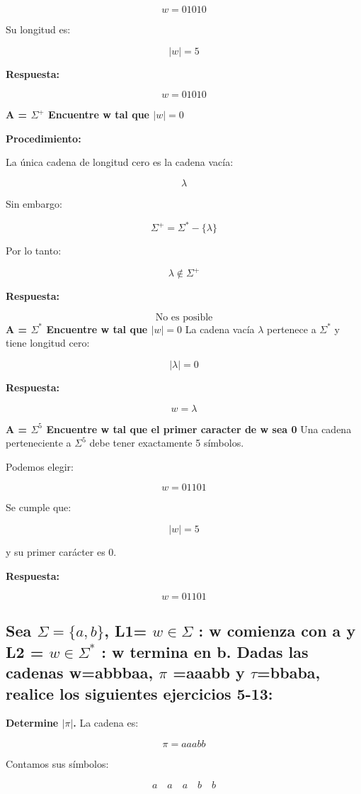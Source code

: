 \documentclass[12pt]{article}
\begin{document}
\[
w = 01010
\]

Su longitud es:

\[
|w| = 5
\]

\textbf{Respuesta:}

\[
\boxed{w=01010}
\]

\textbf{A = $\Sigma^+$ Encuentre w tal que $|w| =0$}

\textbf{Procedimiento:}

La única cadena de longitud cero es la cadena vacía:

\[
\lambda
\]

Sin embargo:

\[
\Sigma^+ = \Sigma^*-\{\lambda\}
\]

Por lo tanto:

\[
\lambda \notin \Sigma^+
\]

\textbf{Respuesta:}

\[
\boxed{\text{No es posible}}
\]
\textbf{A = $\Sigma^*$ Encuentre w tal que $|w| =0$}
La cadena vacía $\lambda$ pertenece a $\Sigma^*$ y tiene longitud cero:

\[
|\lambda|=0
\]

\textbf{Respuesta:}

\[
\boxed{w=\lambda}
\]


\textbf{A = $\Sigma^5$ Encuentre w tal que el primer caracter de w sea 0}
Una cadena perteneciente a $\Sigma^5$ debe tener exactamente
5 símbolos.

Podemos elegir:

\[
w=01101
\]

Se cumple que:

\[
|w|=5
\]

y su primer carácter es $0$.

\textbf{Respuesta:}

\[
\boxed{w=01101}
\]


\subsection{Sea $\Sigma = \{a,b\}$, L1= {$ w \in \Sigma $ : w comienza con a} y L2 ={{ $w \in \Sigma^*$ : w termina en b}}.
Dadas las cadenas w=abbbaa, $\pi$ =aaabb y $\tau$=bbaba, realice los siguientes ejercicios 5-13:}

\textbf{Determine  $|\pi|$.}
La cadena es:

\[
\pi=aaabb
\]

Contamos sus símbolos:

\[
a\quad a\quad a\quad b\quad b
\]
\end{document}
